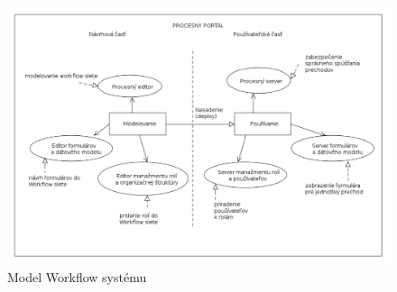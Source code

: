 	\begin{figure}[h]
		\centering
		\includegraphics[width=0.9\linewidth]{images/model_apk}
		\caption{Model Workflow systému}
		\label{fig:model_apk} 
	\end{figure}





